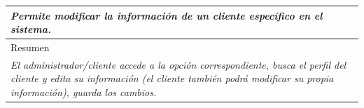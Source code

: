 \begin{table}[H]
\begin{tabular}{|llllllll|}
    \multicolumn{8}{|p{15cm}|}{{\color[HTML]{808080} \textit{Permite modificar la información de un cliente específico en el sistema.}}}                                                                                                                                                                                       \\ \hline
    \multicolumn{8}{|l|}{Resumen}                                                                                                                                                                                                                                           \\ \hline
    \multicolumn{8}{|p{15cm}|}{{\color[HTML]{808080} \textit{El administrador/cliente accede a la opción correspondiente, busca el perfil del cliente y edita su información (el cliente también podrá modificar su propia información), guarda los cambios.}}} \\ \hline
    \end{tabular}
\end{table}

